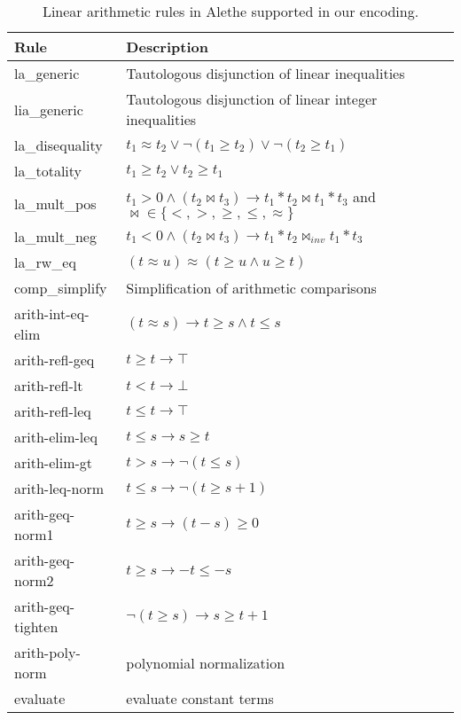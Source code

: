\begin{table}[tp]
  \centering
  \caption{Linear arithmetic rules in Alethe supported in our encoding.}

  \begin{tabular}{l@{\quad}l}
  Rule & Description \\ \hline
  la\_generic & Tautologous disjunction of linear inequalities \\
  lia\_generic & Tautologous disjunction of linear integer inequalities \\
  la\_disequality & $t_1 \approx t_2 \lor \neg (t_1 \geq t_2) \lor \neg (t_2 \geq t_1)$ \\
  la\_totality & $t_1 \geq t_2 \lor t_2 \geq t_1$ \\
  la\_mult\_pos & $t_1 > 0 \land (t_2 \bowtie t_3) \rightarrow t_1 * t_2 \bowtie t_1 * t_3$ and $\mathop{\bowtie} \mathrel{\in} \{<, >, \geq, \leq, \approx\}$ \\
  la\_mult\_neg & $t_1 < 0 \land (t_2 \bowtie t_3) \rightarrow t_1 * t_2 \bowtie_{\mathit{inv}} t_1 * t_3$ \\
  la\_rw\_eq & $(t \approx u) \approx (t \geq u \land u \geq t)$ \\
  comp\_simplify & Simplification of arithmetic comparisons \\
  arith-int-eq-elim & $(t \approx s) \rightarrow t \geq s \land t \leq s $\\
  arith-refl-geq & $t \geq t \rightarrow \top$ \\
  arith-refl-lt & $t < t \rightarrow \bot$ \\
  arith-refl-leq & $t \leq t \rightarrow \top$ \\
  arith-elim-leq & $t \leq s \rightarrow s \geq t$ \\
  arith-elim-gt & $t > s \rightarrow \neg (t \leq s)$ \\
  arith-leq-norm & $t \leq s \rightarrow \neg (t \geq s + 1)$ \\
  arith-geq-norm1 & $t \geq s \rightarrow (t - s) \geq 0$ \\
  arith-geq-norm2 & $t \geq s \rightarrow - t \leq - s$ \\
  arith-geq-tighten & $\neg (t \geq s) \rightarrow s \geq t + 1$ \\
  arith-poly-norm & polynomial normalization \\
  evaluate & evaluate constant terms
  \end{tabular}

  \label{table:linear-arith-rules}
\end{table}

